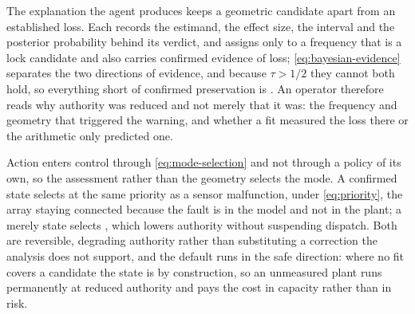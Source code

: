 The explanation the agent produces keeps a geometric candidate apart from an established loss. Each  records the estimand, the effect size, the interval and the posterior probability behind its verdict, and assigns  only to a frequency that is a lock candidate and also carries confirmed evidence of loss; \autoref{eq:bayesian-evidence} separates the two directions of evidence, and because $\tau>1/2$ they cannot both hold, so everything short of confirmed preservation is . An operator therefore reads why authority was reduced and not merely that it was: the frequency and geometry that triggered the warning, and whether a fit measured the loss there or the arithmetic only predicted one.

Action enters control through \autoref{eq:mode-selection} and not through a policy of its own, so the assessment rather than the geometry selects the mode. A confirmed  state selects  at the same priority as a sensor malfunction, under \autoref{eq:priority}, the array staying connected because the fault is in the model and not in the plant; a merely  state selects , which lowers authority without suspending dispatch. Both are reversible, degrading authority rather than substituting a correction the analysis does not support, and the default runs in the safe direction: where no fit covers a candidate the state is  by construction, so an unmeasured plant runs permanently at reduced authority and pays the cost in capacity rather than in risk.
